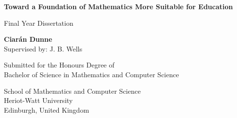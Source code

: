 \documentclass[11pt]{report}
\author{Ciarán Dunne}
\theoremstyle{definition}
\theoremstyle{theorem}
\theoremstyle{lemma}
\begin{document}
\begin{titlepage}
   \begin{center}
       \vspace*{1cm}

       \Large
       \textbf{Toward a Foundation of Mathematics More Suitable for Education}

       \vspace{0.5cm}
       \large
        Final Year Dissertation

       \vspace{1.5cm}

       \textbf{Ciarán Dunne}\\
       Supervised by: J. B. Wells
       \vfill

       Submitted for the Honours Degree of \\
       Bachelor of Science in Mathematics and Computer Science

       \vspace{0.8cm}

       School of Mathematics and Computer Science\\
       Heriot-Watt University\\
       Edinburgh, United Kingdom\\
   \end{center}
\end{titlepage}
\end{document}
